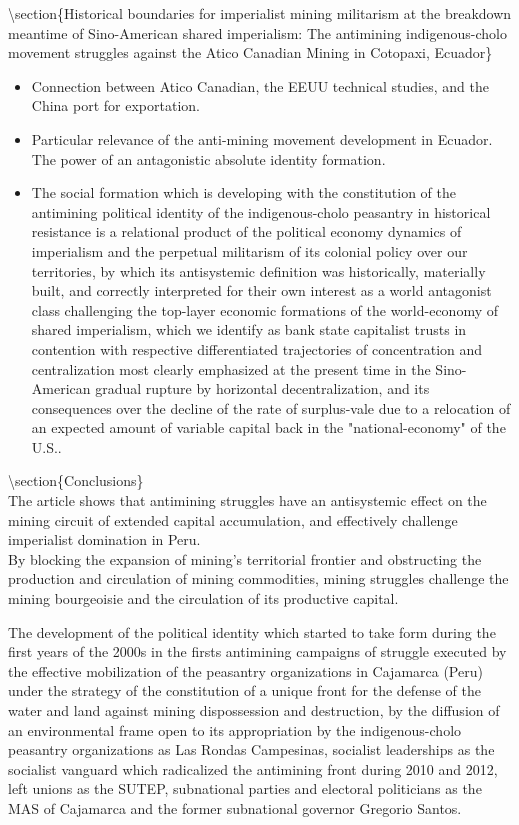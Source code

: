 \documentclass[
]{article}
\providecommand{\tightlist}{%
  \setlength{\itemsep}{0pt}\setlength{\parskip}{0pt}}
\begin{document}
\textbackslash section\{Historical boundaries for imperialist mining
militarism at the breakdown meantime of Sino-American shared
imperialism: The antimining indigenous-cholo movement struggles against
the Atico Canadian Mining in Cotopaxi, Ecuador\}

\begin{itemize}
\tightlist
\item
  Connection between Atico Canadian, the EEUU technical studies, and the
  China port for exportation.
\item
  Particular relevance of the anti-mining movement development in
  Ecuador. The power of an antagonistic absolute identity formation.
\item
  The social formation which is developing with the constitution of the
  antimining political identity of the indigenous-cholo peasantry in
  historical resistance is a relational product of the political economy
  dynamics of imperialism and the perpetual militarism of its colonial
  policy over our territories, by which its antisystemic definition was
  historically, materially built, and correctly interpreted for their
  own interest as a world antagonist class challenging the top-layer
  economic formations of the world-economy of shared imperialism, which
  we identify as bank state capitalist trusts in contention with
  respective differentiated trajectories of concentration and
  centralization most clearly emphasized at the present time in the
  Sino-American gradual rupture by horizontal decentralization, and its
  consequences over the decline of the rate of surplus-vale due to a
  relocation of an expected amount of variable capital back in the
  "national-economy" of the U.S..
\end{itemize}

\textbackslash section\{Conclusions\}\\
The article shows that antimining struggles have an antisystemic effect
on the mining circuit of extended capital accumulation, and effectively
challenge imperialist domination in Peru.\\
By blocking the expansion of mining's territorial frontier and
obstructing the production and circulation of mining commodities, mining
struggles challenge the mining bourgeoisie and the circulation of its
productive capital.

The development of the political identity which started to take form
during the first years of the 2000s in the firsts antimining campaigns
of struggle executed by the effective mobilization of the peasantry
organizations in Cajamarca (Peru) under the strategy of the constitution
of a unique front for the defense of the water and land against mining
dispossession and destruction, by the diffusion of an environmental
frame open to its appropriation by the indigenous-cholo peasantry
organizations as Las Rondas Campesinas, socialist leaderships as the
socialist vanguard which radicalized the antimining front during 2010
and 2012, left unions as the SUTEP, subnational parties and electoral
politicians as the MAS of Cajamarca and the former subnational governor
Gregorio Santos.
\end{document}
